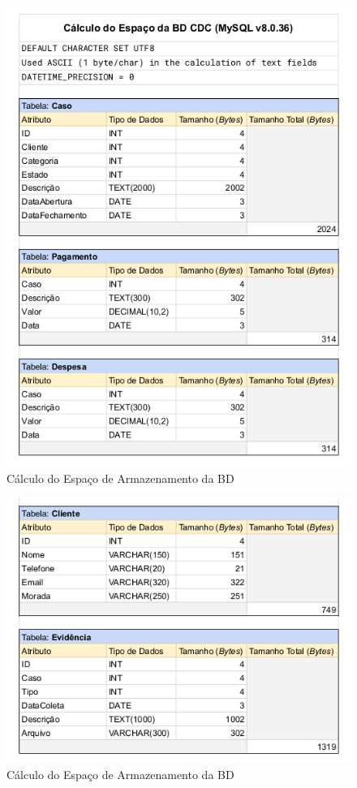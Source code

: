 \documentclass[a4paper,12pt]{scrreprt}
\begin{document}
\begin{figure}[!ht]
    \centering
    \includegraphics[scale=0.83]{images/armazenamento/1.png}
    \caption{Cálculo do Espaço de Armazenamento da BD}
    \label{fig:5.1}
\end{figure}

\begin{figure}[!ht]
    \centering
    \includegraphics[scale=0.83]{images/armazenamento/2.png}
    \caption{Cálculo do Espaço de Armazenamento da BD}
    \label{fig:5.2}
\end{figure}
\end{document}
